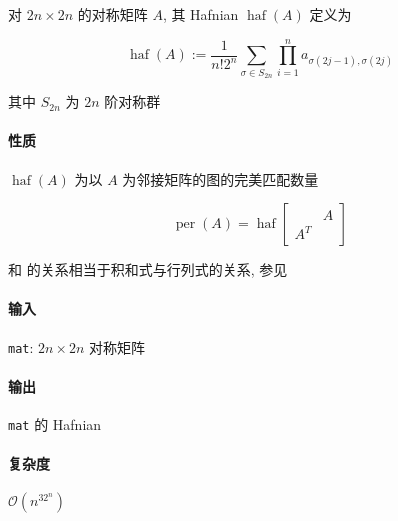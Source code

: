 对 \(2n\times 2n\) 的对称矩阵 \(A\), 其 Hafnian \(\operatorname{haf}(A)\) 定义为

\[
    \operatorname{haf}(A):=\frac{1}{n!2^n}\sum_{\sigma\in S_{2n}}\prod_{i=1}^n a_{\sigma(2j-1),\sigma(2j)}
\]

其中 \(S_{2n}\) 为 \(2n\) 阶对称群

\paragraph{性质}

\(\operatorname{haf}(A)\) 为以 \(A\) 为邻接矩阵的图的完美匹配数量

\[
    \operatorname{per}(A)=\operatorname{haf}\begin{bmatrix}
            & A \\
        A^T & 
    \end{bmatrix}
\]

和  的关系相当于积和式与行列式的关系, 参见 

\paragraph{输入}

\verb|mat|: \(2n\times 2n\) 对称矩阵

\paragraph{输出}

\verb|mat| 的 Hafnian

\paragraph{复杂度}

\(\mathcal{O}(n^32^n)\)
